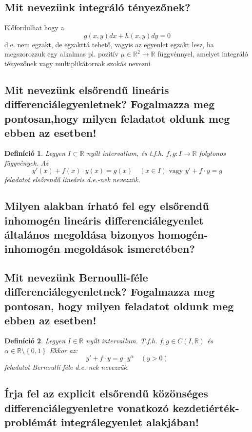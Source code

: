 \documentclass[12pt,a4paper]{article}
\newcommand{\R}{\mathbb{R}}
\newcommand{\bb}[1]{\left( #1 \right)}
\newcommand{\braces}[1]{\left\lbrace #1 \right\rbrace}
\newtheorem{defi}{Definíció}[section]
\begin{document}
\subsection{Mit nevezünk integráló tényezőnek?}
Előfordulhat hogy a
\[
g(x,y)dx + h(x,y)dy = 0
\]
d.e. nem egzakt, de egzakttá tehető, vagyis az egyenlet egzakt lesz, ha megszorozzuk egy alkalmas pl. pozitív $\mu \in \R^2 \to \R $ függvénnyel, amelyet integráló tényezőnek vagy multiplikátornak szokás nevezni
\subsection{Mit nevezünk elsőrendű lineáris differenciálegyenletnek? Fogalmazza meg pontosan,hogy milyen feladatot oldunk meg ebben az esetben!}
\begin{defi}
Legyen $I \subset \R$ nyílt intervallum, és t.f.h. $f,g : I \to \R$ folytonos függvények. Az 
\[
y'(x)+ f(x)\cdot y(x) = g(x) \quad \bb{x \in I} \text{ vagy } y' + f \cdot y = g
\]
feladatot elsőrendű lineáris d.e.-nek nevezzük.
\end{defi}
\subsection{Milyen alakban írható fel egy elsőrendű inhomogén lineáris differenciálegyenlet általános megoldása bizonyos homogén-inhomogén megoldások ismeretében?}

\subsection{Mit nevezünk Bernoulli-féle differenciálegyenletnek? Fogalmazza meg pontosan, hogy milyen feladatot oldunk meg ebben az esetben!}
\begin{defi}
Legyen $I \in \R$ nyílt intervallum. T.f.h. $f, g \in C (I,\R)$ és $\alpha \in \R \setminus \braces{0,1}$ Ekkor az:
\[
y' + f \cdot y = g \cdot y^{\alpha} \quad \bb{y > 0}
\]
feladatot Bernoulli-féle d.e.-nek nevezzük.
\end{defi}
\subsection{Írja fel az explicit elsőrendű közönséges differenciálegyenletre vonatkozó kezdetiérték-problémát integrálegyenlet alakjában!}
\end{document}
